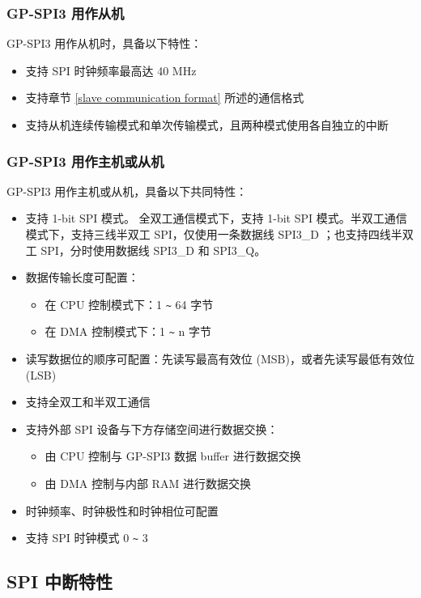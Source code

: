 \documentclass[main\_\_CN.tex]{subfiles}
\begin{document}
\subsubsection{GP-SPI3 用作从机}

GP-SPI3 用作从机时，具备以下特性：
  \begin{itemize}
    \item 支持 SPI 时钟频率最高达 40 MHz
    \item 支持章节 \ref{slave communication format} 所述的通信格式
    \item 支持从机连续传输模式和单次传输模式，且两种模式使用各自独立的中断
  \end{itemize}

\subsubsection{GP-SPI3 用作主机或从机}

GP-SPI3 用作主机或从机，具备以下共同特性：
  \begin{itemize}
    \item 支持 1-bit SPI 模式。 全双工通信模式下，支持 1-bit SPI 模式。半双工通信模式下，支持三线半双工 SPI，仅使用一条数据线 SPI3\_D ；也支持四线半双工 SPI，分时使用数据线 SPI3\_D 和 SPI3\_Q。
    \item 数据传输长度可配置：
    \begin{itemize}
        \item 在 CPU 控制模式下：1 \verb+~+ 64 字节
        \item 在 DMA 控制模式下：1 \verb+~+ n 字节
    \end{itemize}
    \item 读写数据位的顺序可配置：先读写最高有效位 (MSB)，或者先读写最低有效位 (LSB)
    \item 支持全双工和半双工通信
    \item 支持外部 SPI 设备与下方存储空间进行数据交换：
      \begin{itemize}
        \item 由 CPU 控制与 GP-SPI3 数据 buffer 进行数据交换
        \item 由 DMA 控制与内部 RAM 进行数据交换
      \end{itemize}

    \item 时钟频率、时钟极性和时钟相位可配置
    \item 支持 SPI 时钟模式 0 \verb+~+ 3
  \end{itemize}

\subsection{SPI 中断特性}
\end{document}
